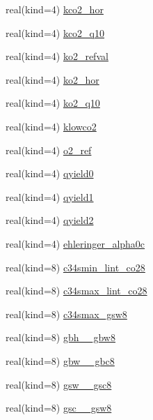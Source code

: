 \begin{DoxyCompactItemize}
real(kind=4) \hyperlink{namespacephysiology__coms_ab83efab85c46032bd663e0c7432b289a}{kco2\+\_\+hor}
\item 
real(kind=4) \hyperlink{namespacephysiology__coms_ac829c2e631b34d9949024fb1bdf3bcb9}{kco2\+\_\+q10}
\item 
real(kind=4) \hyperlink{namespacephysiology__coms_a373b2932120fa360997d160b021af1f5}{ko2\+\_\+refval}
\item 
real(kind=4) \hyperlink{namespacephysiology__coms_a108de5f1d1e5553e2bb64cb194edb76a}{ko2\+\_\+hor}
\item 
real(kind=4) \hyperlink{namespacephysiology__coms_a76dd69909f43d9ff11fab25a03dc5492}{ko2\+\_\+q10}
\item 
real(kind=4) \hyperlink{namespacephysiology__coms_abd19969f43ab2ed5e943e0f26da846cd}{klowco2}
\item 
real(kind=4) \hyperlink{namespacephysiology__coms_a9d23c454c914eb013dcb434bc476a11f}{o2\+\_\+ref}
\item 
real(kind=4) \hyperlink{namespacephysiology__coms_ab7e24ce5122fda9b17878fb18470092a}{qyield0}
\item 
real(kind=4) \hyperlink{namespacephysiology__coms_a47d2f31280dea551cf4c2cd53aff5fc2}{qyield1}
\item 
real(kind=4) \hyperlink{namespacephysiology__coms_a5c1b8d75f0dfc7666093dded3d7ea12a}{qyield2}
\item 
real(kind=4) \hyperlink{namespacephysiology__coms_a95034e71d1d9e03d7872fbe31293a312}{ehleringer\+\_\+alpha0c}
\item 
real(kind=8) \hyperlink{namespacephysiology__coms_a3eacccacc558754ca9fd092a3f19c4f7}{c34smin\+\_\+lint\+\_\+co28}
\item 
real(kind=8) \hyperlink{namespacephysiology__coms_a5737cc18585ebecb1f7ece2f7ec958b8}{c34smax\+\_\+lint\+\_\+co28}
\item 
real(kind=8) \hyperlink{namespacephysiology__coms_a0b21762b30a4dd9c6ca8216a7715c201}{c34smax\+\_\+gsw8}
\item 
real(kind=8) \hyperlink{namespacephysiology__coms_a8033820f67ad5288fa97726389f23458}{gbh\+\_\+\_\+gbw8}
\item 
real(kind=8) \hyperlink{namespacephysiology__coms_a77738c2bf4d08792c7282d50bcc53e3b}{gbw\+\_\+\_\+gbc8}
\item 
real(kind=8) \hyperlink{namespacephysiology__coms_a2771271aa4821d7ed40fc8f23355493f}{gsw\+\_\+\_\+gsc8}
\item 
real(kind=8) \hyperlink{namespacephysiology__coms_af804dfc5ca14c4ad970da65bbca13da1}{gsc\+\_\+\_\+gsw8}

\end{DoxyCompactItemize}
